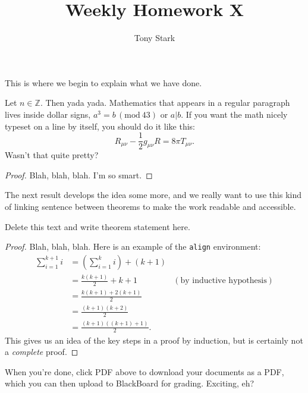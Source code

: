 \documentclass[12pt]{article}
\newcommand{\Z}{\mathbb{Z}}
\renewcommand{\mod}[1]{\,(\text{mod}\ #1)}
\newenvironment{theorem}[2][Theorem]{\begin{trivlist}
\item[\hskip \labelsep {\bfseries #1}\hskip \labelsep {\bfseries #2.}]}{\end{trivlist}}
\begin{document}

\title{Weekly Homework X}%
\author{Tony Stark} %

\maketitle

This is where we begin to explain what we have done. 

\begin{theorem}{x.yz}
Let $n\in \Z$.  Then yada yada. Mathematics that appears in a regular paragraph lives inside dollar signs, $a^3=b \mod{43}$ or $a \vert b$. If you want the math nicely typeset on a line by itself, you should do it like this:
\[
  R_{\mu\nu} - \frac{1}{2} g_{\mu\nu} R = 8\pi T_{\mu\nu}. 
\]
Wasn't that quite pretty?
\end{theorem}

\begin{proof}
Blah, blah, blah.  I'm so smart.
\end{proof}

The next result develops the idea some more, and we really want to use this kind of linking sentence between theorems to make the work readable and accessible. 
\begin{theorem}{x.yz} %
Delete this text and write theorem statement here.
\end{theorem}

\begin{proof}
Blah, blah, blah.  Here is an example of the \texttt{align} environment:
\begin{align*}
\sum_{i=1}^{k+1}i & = \left(\sum_{i=1}^{k}i\right) +(k+1)\\ 
& = \frac{k(k+1)}{2}+k+1 & (\text{by inductive hypothesis})\\
& = \frac{k(k+1)+2(k+1)}{2}\\
& = \frac{(k+1)(k+2)}{2}\\
& = \frac{(k+1)((k+1)+1)}{2}.
\end{align*}
This gives us an idea of the key steps in a proof by induction, but is certainly not a \emph{complete} proof.
\end{proof}

When you're done, click PDF above to download your documents as a PDF, which you can then upload to BlackBoard for grading. Exciting, eh?


\end{document}
